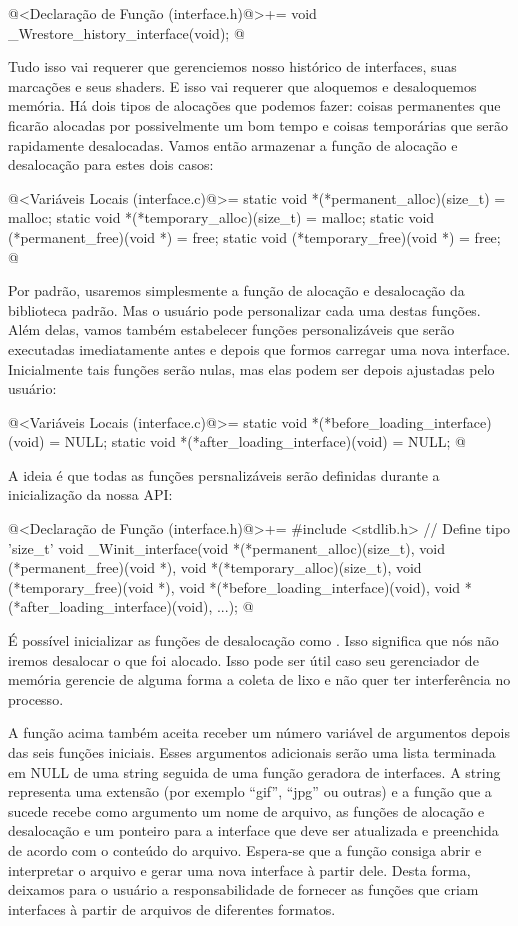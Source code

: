 \iniciocodigo
@<Declaração de Função (interface.h)@>+=
void _Wrestore_history_interface(void);
@
\fimcodigo

Tudo isso vai requerer que gerenciemos nosso histórico de interfaces,
suas marcações e seus shaders. E isso vai requerer que aloquemos e
desaloquemos memória. Há dois tipos de alocações que podemos fazer:
coisas permanentes que ficarão alocadas por possivelmente um bom tempo
e coisas temporárias que serão rapidamente desalocadas. Vamos então
armazenar a função de alocação e desalocação para estes dois casos:

\iniciocodigo
@<Variáveis Locais (interface.c)@>=
static void *(*permanent_alloc)(size_t) = malloc;
static void *(*temporary_alloc)(size_t) = malloc;
static void (*permanent_free)(void *) = free;
static void (*temporary_free)(void *) = free;
@
\fimcodigo

Por padrão, usaremos simplesmente a função de alocação e desalocação
da biblioteca padrão. Mas o usuário pode personalizar cada uma destas
funções. Além delas, vamos também estabelecer funções personalizáveis
que serão executadas imediatamente antes e depois que formos carregar
uma nova interface. Inicialmente tais funções serão nulas, mas elas
podem ser depois ajustadas pelo usuário:

\iniciocodigo
@<Variáveis Locais (interface.c)@>=
static void *(*before_loading_interface)(void) = NULL;
static void *(*after_loading_interface)(void) = NULL;
@
\fimcodigo

A ideia é que todas as funções persnalizáveis serão definidas durante
a inicialização da nossa API:

\iniciocodigo
@<Declaração de Função (interface.h)@>+=
#include <stdlib.h> // Define tipo 'size_t'
void _Winit_interface(void *(*permanent_alloc)(size_t),
                      void (*permanent_free)(void *),
                      void *(*temporary_alloc)(size_t),
                      void (*temporary_free)(void *),
                      void *(*before_loading_interface)(void),
                      void *(*after_loading_interface)(void),
                      ...);
@
\fimcodigo


É possível inicializar as funções de desalocação como
. Isso significa que nós não iremos desalocar o que
foi alocado. Isso pode ser útil caso seu gerenciador de memória
gerencie de alguma forma a coleta de lixo e não quer ter interferência
no processo.

A função acima também aceita receber um número variável de argumentos
depois das seis funções iniciais. Esses argumentos adicionais serão
uma lista terminada em NULL de uma string seguida de uma função
geradora de interfaces. A string representa uma extensão (por exemplo
``gif'', ``jpg'' ou outras) e a função que a sucede recebe como
argumento um nome de arquivo, as funções de alocação e desalocação e
um ponteiro para a interface que deve ser atualizada e preenchida de
acordo com o conteúdo do arquivo. Espera-se que a função consiga abrir
e interpretar o arquivo e gerar uma nova interface à partir dele.
Desta forma, deixamos para o usuário a responsabilidade de fornecer as
funções que criam interfaces à partir de arquivos de diferentes
formatos.

